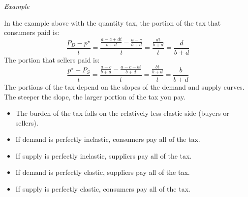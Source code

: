 \documentclass{article}
\begin{document}
\emph{Example}\par\noindent
In the example above with the quantity tax, the portion of the tax that consumers paid is:
\begin{equation*}
  \frac{P_D-p^\star}{t} =\frac{ \frac{a-c+dt}{b+d}-\frac{a-c}{b+d}}{t}=\frac{\frac{dt}{b+d}}{t} = \frac{d}{b+d}
\end{equation*}
The portion that sellers paid is:
\begin{equation*}
  \frac{p^\star-P_S}{t} = \frac{\frac{a-c}{b+d}-\frac{a-c-bt}{b+d}}{t}=\frac{\frac{bt}{b+d}}{t}=\frac{b}{b+d}
\end{equation*}
The portions of the tax depend on the slopes of the demand and supply curves. The steeper the slope, the larger portion of the tax you pay.
\begin{itemize}
  \item The burden of the tax falls on the relatively less elastic side (buyers or sellers).
  \item If demand is perfectly inelastic, consumers pay all of the tax.
  \item If supply is perfectly inelastic, suppliers pay all of the tax.
  \item If demand is perfectly elastic, suppliers pay all of the tax.
  \item If supply is perfectly elastic, consumers pay all of the tax.
\end{itemize}
\end{document}
